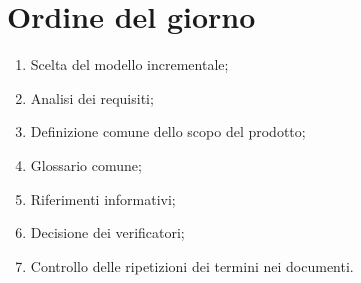 \documentclass[../verbale-2016-12-19.tex]{subfiles}
\begin{document}
	
\section{Ordine del giorno}
	\begin{enumerate}

		\item Scelta del modello incrementale;
		\item Analisi dei requisiti;
		\item Definizione comune dello scopo del prodotto;
		\item Glossario comune;
		\item Riferimenti informativi;
		\item Decisione dei verificatori;
		\item Controllo delle ripetizioni dei termini nei documenti.
	\end{enumerate}
	
\end{document}
